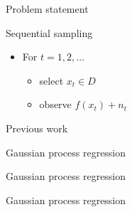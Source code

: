 \documentclass[xetex,10pt,mathserif,handout]{beamer}
\newlength\figureheight
\newlength\figurewidth
\begin{document}
\begin{frame}{Problem statement}

Sequential sampling
\vspace{0.5em}
\begin{itemize}
\item For $t = 1, 2, \ldots$
  \vspace{0.5em}
  \begin{itemize}
    \item select $x_t \in D$
    \vspace{0.5em}
    \item observe $f(x_t) + n_t$
  \end{itemize}
\end{itemize}

\end{frame}

\begin{frame}{Previous work}
\end{frame}

\begin{frame}{Gaussian process regression}
\centering
\setlength\figurewidth{5in}
\setlength\figureheight{3.5in}

\end{frame}

\begin{frame}{Gaussian process regression}
\centering
\setlength\figurewidth{5in}
\setlength\figureheight{3.5in}

\end{frame}

\begin{frame}{Gaussian process regression}
\centering
\setlength\figurewidth{5in}
\setlength\figureheight{3.5in}

\end{frame}
\end{document}
